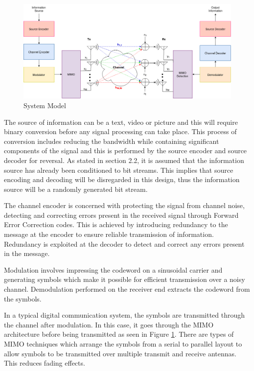 \documentclass[pdftex,11pt,a4paper]{article}
\begin{document}
\begin{figure}[h!]
    \centering
    \includegraphics[width=\textwidth]{system4.png}
    \caption{System Model}
    \label{fig:1}
\end{figure}{}

The source of information can be a text, video or picture and this will require binary conversion before any signal processing can take place. This process of conversion includes reducing the bandwidth while containing significant components of the signal and this is performed by the source encoder and source decoder for reversal. As stated in section 2.2, it is assumed that the information source has already been conditioned to bit streams. This implies that source encoding and decoding will be disregarded in this design, thus the information source will be a randomly generated bit stream. 

The channel encoder is concerned with protecting the signal from channel noise, detecting and correcting errors present in the received signal through Forward Error Correction codes. This is achieved by introducing redundancy to the message at the encoder to ensure reliable transmission of information. Redundancy is exploited at the decoder to detect and correct any errors present in the message. 

Modulation involves impressing the codeword on a sinusoidal carrier and generating symbols which make it possible for efficient transmission over a noisy channel. Demodulation performed on the receiver end extracts the codeword from the symbols.

In a typical digital communication system, the symbols are transmitted through the channel after modulation. In this case, it goes through the MIMO architecture before being transmitted as seen in Figure \ref{fig:1}. There are types of MIMO techniques which arrange the symbols from a serial to parallel layout to allow symbols to be transmitted over multiple transmit and receive antennas. This reduces fading effects.
\end{document}
